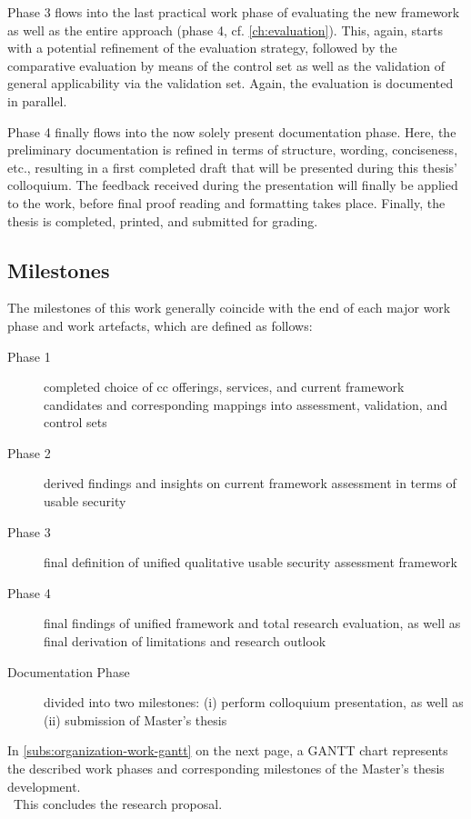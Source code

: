 	Phase 3 flows into the last practical work phase of evaluating the new framework as well as the entire approach (phase 4, cf. \autoref{ch:evaluation}). This, again, starts with a potential refinement of the evaluation strategy, followed by the comparative evaluation by means of the control set as well as the validation of general applicability via the validation set. Again, the evaluation is documented in parallel.
	
	Phase 4 finally flows into the now solely present documentation phase. Here, the preliminary documentation is refined in terms of structure, wording, conciseness, etc., resulting in a first completed draft that will be presented during this thesis' colloquium. The feedback received during the presentation will finally be applied to the work, before final proof reading and formatting takes place. Finally, the thesis is completed, printed, and submitted for grading.
	
	\subsection{Milestones}
	The milestones of this work generally coincide with the end of each major work phase and work artefacts, which are defined as follows:
	
	\begin{description}
		\item[Phase 1] completed choice of \ac{cc} offerings, services, and current framework candidates and corresponding mappings into assessment, validation, and control sets
		\item[Phase 2] derived findings and insights on current framework assessment in terms of usable security
		\item[Phase 3] final definition of unified qualitative usable security assessment framework
		\item[Phase 4] final findings of unified framework and total research evaluation, as well as final derivation of limitations and research outlook 
		\item[Documentation Phase] divided into two milestones: (i) perform colloquium presentation, as well as (ii) submission of Master's thesis
	\end{description}
	
	In \autoref{subs:organization-work-gantt} on the next page, a  GANTT chart represents the described work phases and corresponding milestones of the Master's thesis development. 	\\\ This concludes the research proposal.
	
